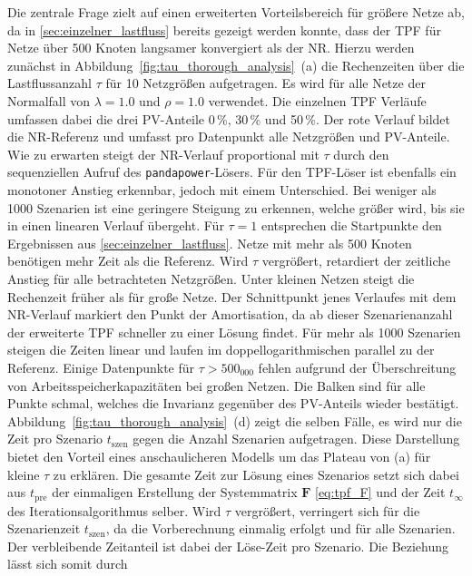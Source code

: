 Die zentrale Frage zielt auf einen erweiterten Vorteilsbereich für größere Netze ab, da in \cref{sec:einzelner_lastfluss} bereits gezeigt werden konnte, dass der TPF für Netze über 500 Knoten langsamer konvergiert als der NR.
Hierzu werden zunächst in Abbildung~\ref{fig:tau_thorough_analysis}~(a) die Rechenzeiten über die Lastflussanzahl $\tau$ für 10 Netzgrößen aufgetragen. 
Es wird für alle Netze der Normalfall von $\lambda=1.0$ und $\rho=1.0$ verwendet.
Die einzelnen TPF Verläufe umfassen dabei die drei PV-Anteile 0\,\%, 30\,\% und 50\,\%. 
Der rote Verlauf bildet die NR-Referenz und umfasst pro Datenpunkt alle Netzgrößen und PV-Anteile.\\

Wie zu erwarten steigt der NR-Verlauf proportional mit $\tau$ durch den sequenziellen Aufruf des \texttt{pandapower}-Lösers.
Für den TPF-Löser ist ebenfalls ein monotoner Anstieg erkennbar, jedoch mit einem Unterschied.
Bei weniger als 1000 Szenarien ist eine geringere Steigung zu erkennen, welche größer wird, bis sie in einen linearen Verlauf übergeht.
Für $\tau=1$ entsprechen die Startpunkte den Ergebnissen aus \cref{sec:einzelner_lastfluss}. 
Netze mit mehr als 500 Knoten benötigen mehr Zeit als die Referenz.
Wird $\tau$ vergrößert, retardiert der zeitliche Anstieg für alle betrachteten Netzgrößen.
Unter kleinen Netzen steigt die Rechenzeit früher als für große Netze.
Der Schnittpunkt jenes Verlaufes mit dem NR-Verlauf markiert den Punkt der Amortisation, da ab dieser Szenarienanzahl der erweiterte TPF schneller zu einer Lösung findet.
Für mehr als 1000 Szenarien steigen die Zeiten linear und laufen im doppellogarithmischen parallel zu der Referenz.
Einige Datenpunkte für $\tau>500_000$ fehlen aufgrund der Überschreitung von Arbeitsspeicherkapazitäten bei großen Netzen.
Die Balken sind für alle Punkte schmal, welches die Invarianz gegenüber des PV-Anteils wieder bestätigt.\\

Abbildung~\ref{fig:tau_thorough_analysis}~(d) zeigt die selben Fälle, es wird nur die Zeit pro Szenario $t_\mathrm{szen}$ gegen die Anzahl Szenarien aufgetragen.
Diese Darstellung bietet den Vorteil eines anschaulicheren Modells um das Plateau von (a) für kleine $\tau$ zu erklären.
Die gesamte Zeit zur Lösung eines Szenarios setzt sich dabei aus $t_\mathrm{pre}$ der einmaligen Erstellung der Systemmatrix $\mathbf{F}$ \eqref{eq:tpf_F} und der Zeit $t_\infty$ des Iterationsalgorithmus selber.
Wird $\tau$ vergrößert, verringert sich für die Szenarienzeit $t_\mathrm{szen}$, da die Vorberechnung einmalig erfolgt und für alle Szenarien.
Der verbleibende Zeitanteil ist dabei der Löse-Zeit pro Szenario.
Die Beziehung lässt sich somit durch

